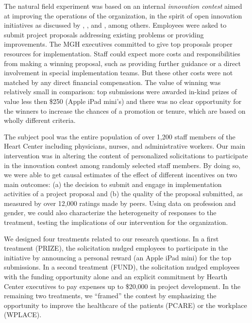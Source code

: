 \documentclass[11pt, titlepage]{article}
\begin{document}
The natural field experiment was based on an internal \emph{innovation
contest} aimed at improving the operations of the organization, in the
spirit of open innovation initiatives as discussed by
\citet{terwiesch2008innovation}, \citet{guinan2013experiments}, and
\citet{lakhani2013prize}, among others. Employees were asked to submit
project proposals addressing existing problems or providing
improvements. The MGH executives committed to give top proposals proper
resources for implementation. Staff could expect more costs and
responsibilities from making a winning proposal, such as providing
further guidance or a direct involvement in special implementation
teams. But these other costs were not matched by any direct financial
compensation. The value of winning was relatively small in comparison:
top submissions were awarded in-kind prizes of value less then \$250
(Apple iPad mini's) and there was no clear opportunity for the winners
to increase the chances of a promotion or tenure, which are based on
wholly different criteria.

The subject pool was the entire population of over 1,200 staff members
of the Heart Center including physicians, nurses, and administrative
workers. Our main intervention was in altering the content of
personalized solicitations to participate in the innovation contest
among randomly selected staff members. By doing so, we were able to get
causal estimates of the effect of different incentives on two main
outcomes: (a) the decision to submit and engage in implementation
activities of a project proposal and (b) the quality of the proposal
submitted, as measured by over 12,000 ratings made by peers. Using data
on profession and gender, we could also characterize the heterogeneity
of responses to the treatment, testing the implications of our
intervention for the organization.

We designed four treatments related to our research questions. In a
first treatment (PRIZE), the solicitation nudged employees to
participate in the initiative by announcing a personal reward (an Apple
iPad mini) for the top submissions. In a second treatment (FUND), the
solicitation nudged employees with the funding opportunity alone and an
explicit commitment by Hearth Center executives to pay expenses up to
\$20,000 in project development. In the remaining two treatments, we
``framed'' the contest by emphasizing the opportunity to improve the
healthcare of the patients (PCARE) or the workplace (WPLACE).
\end{document}
